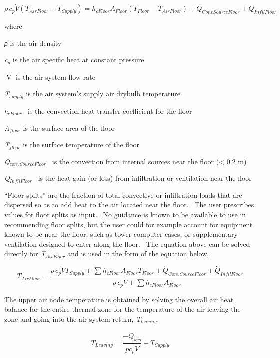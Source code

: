 \begin{equation}
\rho \,{c_p}\dot V({T_{AirFloor}} - {T_{Supply}}) = {h_{cFloor}}{A_{Floor}}({T_{Floor}} - {T_{AirFloor}}) + {Q_{ConvSourceFloor}} + {Q_{InfilFloor}}
\end{equation}

where

\emph{ρ} is the air density

\emph{c\(_{p}\)} is the air specific heat at constant pressure

\(\mathop V\limits^\cdot\) is the air system flow rate

\emph{T\(_{supply}\)} is the air system's supply air drybulb temperature

\emph{h\(_{cFloor}\)} ~is the convection heat transfer coefficient for the floor

\emph{A\(_{floor}\)} is the surface area of the floor

\emph{T\(_{floor}\)} is the surface temperature of the floor

\emph{Q\(_{convSourceFloor}\)~} is the convection from internal sources near the floor (\textless{} 0.2 m)

\emph{Q\(_{InfilFloor}\)}~ is the heat gain (or loss) from infiltration or ventilation near the floor

``Floor splits'' are the fraction of total convective or infiltration loads that are dispersed so as to add heat to the air located near the floor.~ The user prescribes values for floor splits as input.~ No guidance is known to be available to use in recommending floor splits, but the user could for example account for equipment known to be near the floor, such as tower computer cases, or supplementary ventilation designed to enter along the floor.~ The equation above can be solved directly for \emph{T\(_{AirFloor}\)} and is used in the form of the equation below,

\begin{equation}
{T_{AirFloor}} = \frac{{\rho \,{c_p}\dot V{T_{Supply}} + \sum {{h_{cFloor}}{A_{Floor}}{T_{Floor}}}  + {{\dot Q}_{ConvSourceFloor}} + {{\dot Q}_{InfilFloor}}}}{{\rho \,{c_p}\dot V + \sum {{h_{cFloor}}{A_{Floor}}} }}
\end{equation}

The upper air node temperature is obtained by solving the overall air heat balance for the entire thermal zone for the temperature of the air leaving the zone and going into the air system return, \emph{T\(_{leaving}\)}.

\begin{equation}
{T_{Leaving}} = \frac{{ - {{\dot Q}_{sys}}}}{{p{c_p}\dot V}} + {T_{Supply}}
\end{equation}

